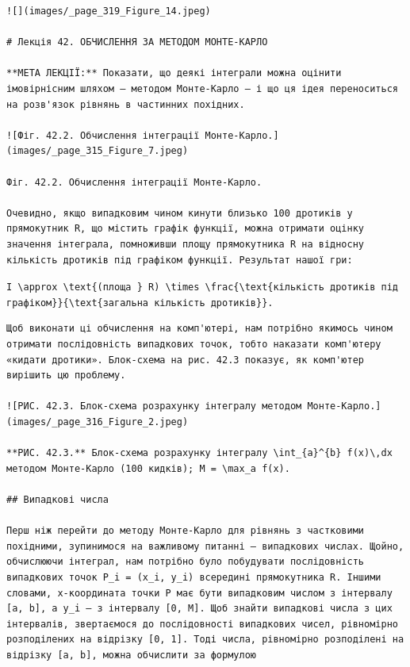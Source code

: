 \documentclass[
  ukrainian,
]{article}
\begin{document}
\begin{verbatim}
![](images/_page_319_Figure_14.jpeg)

# Лекція 42. ОБЧИСЛЕННЯ ЗА МЕТОДОМ МОНТЕ-КАРЛО

**МЕТА ЛЕКЦІЇ:** Показати, що деякі інтеграли можна оцінити імовірнісним шляхом — методом Монте-Карло — і що ця ідея переноситься на розв'язок рівнянь в частинних похідних.

![Фіг. 42.2. Обчислення інтеграції Монте-Карло.](images/_page_315_Figure_7.jpeg)

Фіг. 42.2. Обчислення інтеграції Монте-Карло.

Очевидно, якщо випадковим чином кинути близько 100 дротиків у прямокутник R, що містить графік функції, можна отримати оцінку значення інтеграла, помноживши площу прямокутника R на відносну кількість дротиків під графіком функції. Результат нашої гри:
\end{verbatim}

\texttt{I\ \textbackslash{}approx\ \textbackslash{}text\{(площа\ \}\ R)\ \textbackslash{}times\ \textbackslash{}frac\{\textbackslash{}text\{кількість\ дротиків\ під\ графіком\}\}\{\textbackslash{}text\{загальна\ кількість\ дротиків\}\}.}

\begin{verbatim}
Щоб виконати ці обчислення на комп'ютері, нам потрібно якимось чином отримати послідовність випадкових точок, тобто наказати комп'ютеру «кидати дротики». Блок-схема на рис. 42.3 показує, як комп'ютер вирішить цю проблему.

![РИС. 42.3. Блок-схема розрахунку інтегралу методом Монте-Карло.](images/_page_316_Figure_2.jpeg)

**РИС. 42.3.** Блок-схема розрахунку інтегралу \int_{a}^{b} f(x)\,dx методом Монте-Карло (100 кидків); M = \max_a f(x).

## Випадкові числа

Перш ніж перейти до методу Монте-Карло для рівнянь з частковими похідними, зупинимося на важливому питанні — випадкових числах. Щойно, обчислюючи інтеграл, нам потрібно було побудувати послідовність випадкових точок P_i = (x_i, y_i) всередині прямокутника R. Іншими словами, x-координата точки P має бути випадковим числом з інтервалу [a, b], а y_i — з інтервалу [0, M]. Щоб знайти випадкові числа з цих інтервалів, звертаємося до послідовності випадкових чисел, рівномірно розподілених на відрізку [0, 1]. Тоді числа, рівномірно розподілені на відрізку [a, b], можна обчислити за формулою
\end{verbatim}
\end{document}
